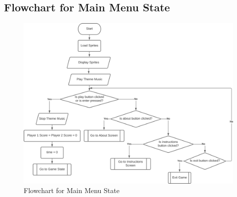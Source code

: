 \documentclass[main]{subfiles}
\begin{document}
	\subsection{Flowchart for Main Menu State}
	    \begin{figure}[H]
	        \centering
	        \includegraphics[scale=0.4]{graphics/flowcharts/main_menu.png}
	        \caption{Flowchart for Main Menu State}
	        \label{fig:main_menu}
	    \end{figure}
	
	
\end{document}
